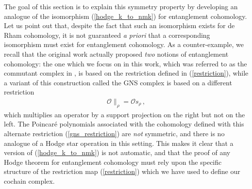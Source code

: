 \documentclass[12pt]{article}
\numberwithin{equation}{section}
\begin{document}
The goal of this section is to explain this symmetry property by developing an analogue of the isomorphism (\ref{hodge_k_to_nmk}) for entanglement cohomology. Let us point out that, despite the fact that such an isomorphism exists for de Rham cohomology, it is not guaranteed \emph{a priori} that a corresponding isomorphism must exist for entanglement cohomology. As a counter-example, we recall that the original work \cite{Mainiero:2019enr} actually proposed \emph{two} notions of entanglement cohomology: the one which we focus on in this work, which was referred to as the commutant complex in \cite{Mainiero:2019enr}, is based on the restriction defined in (\ref{restriction}), while a variant of this construction called the GNS complex is based on a different restriction
%
\begin{align}\label{gns_restriction}
    \mathcal{O} \big\|_{\rho} = \mathcal{O} s_\rho \, ,
\end{align}
%
which multiplies an operator by a support projection on the right but not on the left. The Poincar\'e polynomials associated with the cohomology defined with this alternate restriction (\ref{gns_restriction}) are \emph{not} symmetric, and there is no analogue of a Hodge star operation in this setting. This makes it clear that a version of (\ref{hodge_k_to_nmk}) is not automatic, and that the proof of any Hodge theorem for entanglement cohomology must rely upon the specific structure of the restriction map (\ref{restriction}) which we have used to define our cochain complex.
\end{document}
